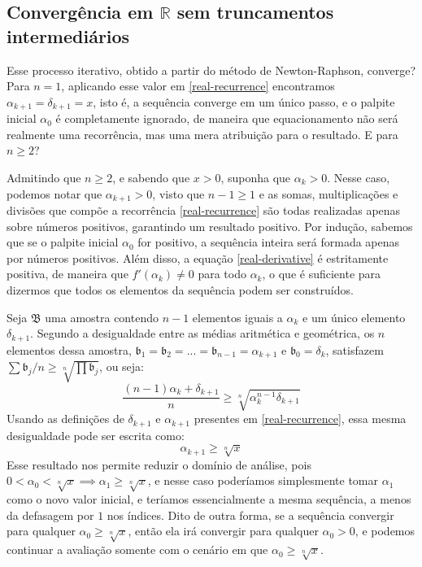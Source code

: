 \subsection*{Convergência em $\mathds{R}$
             sem truncamentos intermediários}

Esse processo iterativo,
obtido a partir do método de Newton-Raphson,
converge?
Para $n = 1$,
aplicando esse valor em \eqref{real-recurrence}
encontramos $\alpha_{k+1} = \delta_{k+1} = x$,
isto é, a sequência converge em um único passo,
e o palpite inicial $\alpha_0$ é completamente ignorado,
de maneira que equacionamento não será realmente uma recorrência,
mas uma mera atribuição para o resultado.
E para $n \ge 2$?

Admitindo que $n \ge 2$, e sabendo que $x > 0$,
suponha que $\alpha_k > 0$.
Nesse caso, podemos notar que $\alpha_{k+1} > 0$,
visto que $n - 1 \ge 1$ e as somas, multiplicações e divisões
que compõe a recorrência \eqref{real-recurrence}
são todas realizadas apenas sobre números positivos,
garantindo um resultado positivo.
Por indução, sabemos que se o palpite inicial $\alpha_0$ for positivo,
a sequência inteira será formada apenas por números positivos.
Além disso, a equação \eqref{real-derivative} é estritamente positiva,
de maneira que $f'(\alpha_k) \ne 0$ para todo $\alpha_k$,
o que é suficiente para dizermos que todos os elementos da sequência
podem ser construídos.

Seja $\mathfrak{B}$ uma amostra
contendo $n - 1$ elementos iguais a $\alpha_k$
e um único elemento $\delta_{k+1}$.
Segundo a desigualdade entre as médias aritmética e geométrica,
os $n$ elementos dessa amostra,
$\mathfrak{b}_1 = \mathfrak{b}_2 = ... = \mathfrak{b}_{n-1}
                = \alpha_{k+1}$
e $\mathfrak{b}_0 = \delta_k$,
satisfazem
$\sum \mathfrak{b}_j/n \ge \sqrt[n]{\prod \mathfrak{b}_j}$,
ou seja:
\begin{equation}
  \dfrac{(n-1) \alpha_k + \delta_{k+1}}{n} \ge
  \sqrt[n]{\alpha_k^{n-1} \delta_{k+1}}
\end{equation}
Usando as definições de $\delta_{k+1}$ e $\alpha_{k+1}$
presentes em \eqref{real-recurrence},
essa mesma desigualdade pode ser escrita como:
\begin{equation}\label{real-amgm-min-alphak+1}
  \alpha_{k+1} \ge \sqrt[n]{x}
\end{equation}
Esse resultado nos permite reduzir o domínio de análise,
pois $0 < \alpha_0 < \sqrt[n]{x} \implies \alpha_1 \ge \sqrt[n]{x}$,
e nesse caso poderíamos simplesmente tomar $\alpha_1$
como o novo valor inicial, e teríamos essencialmente a mesma sequência,
a menos da defasagem por $1$ nos índices.
Dito de outra forma,
se a sequência convergir para qualquer $\alpha_0 \ge \sqrt[n]{x}$,
então ela irá convergir para qualquer $\alpha_0 > 0$,
e podemos continuar a avaliação
somente com o cenário em que $\alpha_0 \ge \sqrt[n]{x}$.

